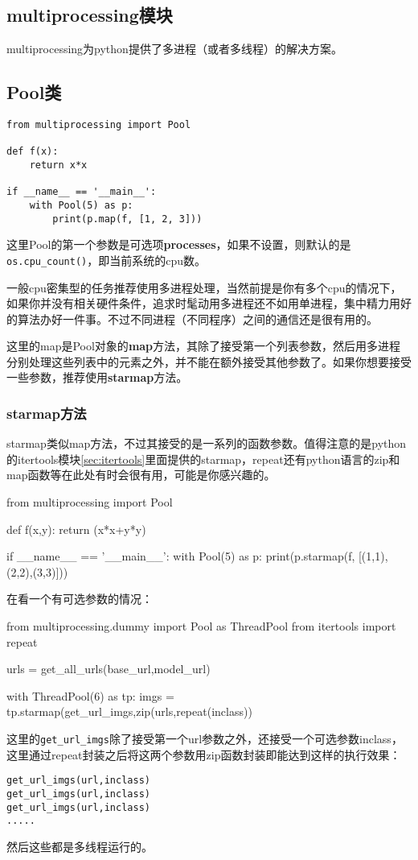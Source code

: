 \documentclass[12pt,oneside]{book}
\begin{document}
\begin{common-format}
\chapter{multiprocessing模块}
multiprocessing为python提供了多进程（或者多线程）的解决方案。

\section{Pool类}
\begin{Verbatim}
from multiprocessing import Pool

def f(x):
    return x*x

if __name__ == '__main__':
    with Pool(5) as p:
        print(p.map(f, [1, 2, 3]))
\end{Verbatim}
这里Pool的第一个参数是可选项\textbf{processes}，如果不设置，则默认的是\verb+os.cpu_count()+，即当前系统的cpu数。

一般cpu密集型的任务推荐使用多进程处理，当然前提是你有多个cpu的情况下，如果你并没有相关硬件条件，追求时髦动用多进程还不如用单进程，集中精力用好的算法办好一件事。不过不同进程（不同程序）之间的通信还是很有用的。

这里的map是Pool对象的\textbf{map}方法，其除了接受第一个列表参数，然后用多进程分别处理这些列表中的元素之外，并不能在额外接受其他参数了。如果你想要接受一些参数，推荐使用\textbf{starmap}方法。

\subsection{starmap方法}
starmap类似map方法，不过其接受的是一系列的函数参数。值得注意的是python的itertools模块\ref{sec:itertools}里面提供的starmap，repeat还有python语言的zip和map函数等在此处有时会很有用，可能是你感兴趣的。
\begin{tcbpython}[]
from multiprocessing import Pool

def f(x,y):
    return (x*x+y*y)

if __name__ == '__main__':
    with Pool(5) as p:
        print(p.starmap(f, [(1,1),(2,2),(3,3)]))
\end{tcbpython}

在看一个有可选参数的情况：

\begin{tcbpython}[]
from multiprocessing.dummy import Pool as ThreadPool
from itertools import repeat

urls = get_all_urls(base_url,model_url)

with ThreadPool(6) as tp:
    imgs = tp.starmap(get_url_imgs,zip(urls,repeat(inclass))
\end{tcbpython}
这里的\verb+get_url_imgs+除了接受第一个url参数之外，还接受一个可选参数inclass，这里通过repeat封装之后将这两个参数用zip函数封装即能达到这样的执行效果：
\begin{Verbatim}
get_url_imgs(url,inclass)
get_url_imgs(url,inclass)
get_url_imgs(url,inclass)
.....
\end{Verbatim}
然后这些都是多线程运行的。



\end{common-format}
\end{document}
